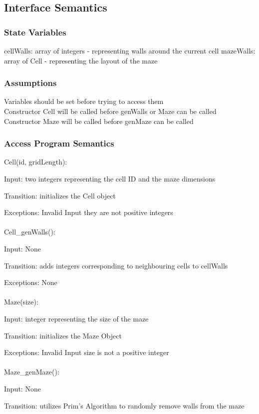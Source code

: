 \documentclass[12pt, titlepage]{article}
\begin{document}
		\subsection{Interface Semantics}
		\subsubsection{State Variables}
		cellWalls: array of integers - representing walls around the current cell
		mazeWalls: array of Cell - representing the layout of the maze
		
		\subsubsection{Assumptions}
		Variables should be set before trying to access them \\ 
		Constructor Cell will be called before genWalls or Maze can be called \\
	    Constructor Maze will be called before genMaze can be called \\
		
		\subsubsection{Access Program Semantics}
		Cell(id, gridLength):
		
		Input: two integers representing the cell ID and the maze dimensions
		
		Transition: initializes the Cell object
		
		Exceptions: Invalid Input they are not positive integers\\
		\\
		Cell\_genWalls():
		
		Input: None
		
		Transition: adds integers corresponding to neighbouring cells to cellWalls
		
		Exceptions: None\\
		\\
		Maze(size):
		
		Input: integer representing the size of the maze
		
		Transition: initializes the Maze Object
		
		Exceptions: Invalid Input size is not a positive integer\\
		\\
		Maze\_genMaze():
		
		Input: None
		
		Transition: utilizes Prim's Algorithm to randomly remove walls from the maze 
		
\end{document}
